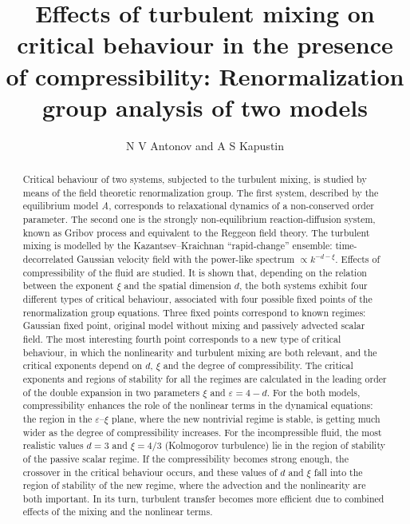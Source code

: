 \documentclass[12pt]{iopart}
\begin{document}
\title[Effects of turbulent mixing on critical behaviour in the presence
of compressibility] {Effects of turbulent mixing on critical
behaviour in the presence of compressibility: Renormalization
group analysis of two models}

\author{ N V Antonov and A S Kapustin}

\address{Department of Theoretical Physics, St.~Petersburg State University
\\ Uljanovskaja 1, St.~Petersburg, Petrodvorez, 198504 Russia}


\begin{abstract}
Critical behaviour of two systems, subjected to the turbulent
mixing, is studied by means of the field theoretic renormalization
group. The first system, described by the equilibrium model {\it
A}, corresponds to relaxational dynamics of a non-conserved order
parameter. The second one is the strongly non-equilibrium
reaction-diffusion system, known as Gribov process and equivalent
to the Reggeon field theory. The turbulent mixing is modelled by
the Kazantsev--Kraichnan ``rapid-change'' ensemble:
time-decorrelated Gaussian velocity field with the power-like
spectrum $\propto k^{-d-\xi}$. Effects of compressibility of the
fluid are studied. It is shown that, depending on the relation
between the exponent $\xi$ and the spatial dimension $d$, the both
systems exhibit four different types of critical behaviour,
associated with four possible fixed points of the renormalization
group equations. Three fixed points correspond to known regimes:
Gaussian fixed point, original model without mixing and passively
advected scalar field. The most interesting fourth point
corresponds to a new type of critical behaviour, in which the
nonlinearity and turbulent mixing are both relevant, and the
critical exponents depend on $d$, $\xi$ and the degree of
compressibility. The critical exponents and regions of stability
for all the regimes are calculated in the leading order of the
double expansion in two parameters $\xi$ and $\varepsilon=4-d$.
For the both models, compressibility enhances the role of the
nonlinear terms in the dynamical equations: the region in the
$\varepsilon$--$\xi$ plane, where the new nontrivial regime is
stable, is getting much wider as the degree of compressibility
increases. For the incompressible fluid, the most realistic values
$d=3$ and $\xi=4/3$ (Kolmogorov turbulence) lie in the region of
stability of the passive scalar regime. If the compressibility
becomes strong enough, the crossover in the critical behaviour
occurs, and these values of $d$ and $\xi$ fall into the region of
stability of the new regime, where the advection and the
nonlinearity are both important. In its turn, turbulent transfer
becomes more efficient due to combined effects of the mixing and
the nonlinear terms.
\end{abstract}
\end{document}
